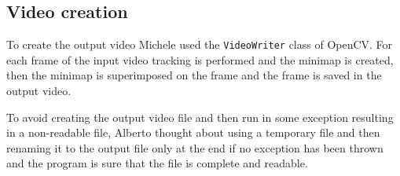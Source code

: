 \subsection{Video creation}
To create the output video Michele used the \texttt{VideoWriter} class of OpenCV.
For each frame of the input video tracking is performed and the minimap is created, then the minimap is superimposed on the frame and the frame is saved in the output video.

To avoid creating the output video file and then run in some exception resulting in a non-readable file, Alberto thought about using a temporary file and then renaming it to the output file only at the end if no exception has been thrown and the program is sure that the file is complete and readable.

